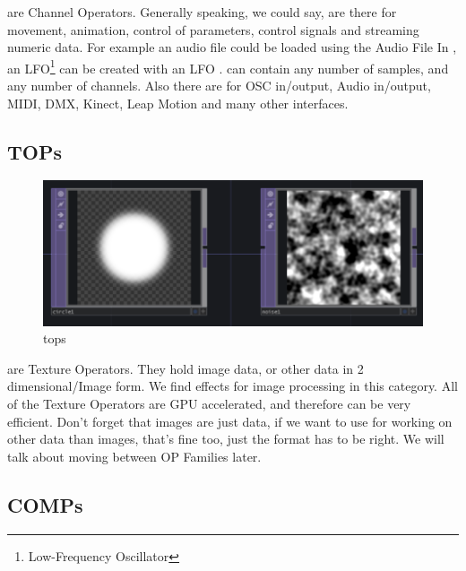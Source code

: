 \CHOPs are Channel Operators. Generally speaking, we could say, \CHOPs are there for movement, animation, control of parameters, control signals and streaming numeric data. For example an audio file could be loaded using the Audio File In \CHOP, an LFO\footnote{Low-Frequency Oscillator} can be created with an LFO \CHOP.  \CHOPs can contain any number of samples, and any number of channels. Also there are \CHOPs for OSC in/output, Audio in/output, MIDI, DMX, Kinect, Leap Motion and many other interfaces.

\subsection{TOPs} %
\label{sub:TOPs}

\begin{figure}[H]
	\begin{center}
		\includegraphics[width = 14cm]{img/tops.png}
		\caption{tops}
		\label{fig:tops}
	\end{center}
\end{figure}
\TOPs are Texture Operators. They hold image data, or other data in 2 dimensional/Image form. We find effects for image processing in this category. All of the Texture Operators are GPU accelerated, and therefore can be very efficient. Don't forget that images are just data, if we want to use \TOPs for working on other data than images, that's fine too, just the format has to be right. We will talk about moving between OP Families later.


\subsection{COMPs} %
\label{sub:COMPs}


